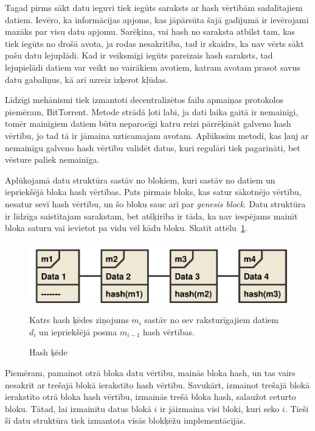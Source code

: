 Tagad pirms sākt datu ieguvi tiek iegūts saraksts ar hash vērtībām sadalītajiem datiem. Ievēro, ka informācijas apjoms, kas jāpārsūta šajā gadījumā ir ievērojami mazāks par visu datu apjomu. Sarēķina, vai hash no saraksta atbilst tam, kas tiek iegūts no drošā avota, ja rodas nesakritība, tad ir skaidrs, ka nav vērts sākt pašu datu lejuplādi. Kad ir veiksmīgi iegūts pareizais hash saraksts, tad lejupielādi datiem var veikt no vairākiem avotiem, katram avotam prasot savus datu gabaliņus, kā arī uzreiz izķerot kļūdas.

Līdzīgi mehānismi tiek izmantoti decentralizētos failu apmaiņas protokolos piemēram, BitTorrent. Metode strādā ļoti labi, ja dati laika gaitā ir nemainīgi, tomēr mainīgiem datiem būtu neparocīgi katru reizi pārrēķināt galveno hash vērtību, jo tad tā ir jāmaina uzticamajam avotam. Aplūkosim metodi, kas ļauj ar nemainīgu galveno hash vērtību validēt datus, kuri regulāri tiek pagarināti, bet vēsture paliek nemainīga.

Aplūkojamā datu struktūra sastāv no blokiem, kuri sastāv no datiem un iepriekšējā bloka hash vērtības.\cite{nakamoto08} Pats pirmais bloks, kas satur sākotnējo vērtību, nesatur sevī hash vērtību, un šo bloku sauc arī par \textit{genesis block}. 
Datu struktūra ir līdzīga saistītajam sarakstam, bet atšķirība ir tāda, ka nav iespējams mainīt bloka saturu vai ievietot pa vidu vēl kādu bloku. Skatīt attēlu~\ref{fig:hash-chain}.


\begin{figure}[htpb]
    \centering
    \includegraphics[scale=0.5]{teorija/hash-chain.pdf}
    \caption{Hash ķēde}
    Katrs hash ķēdes ziņojums $m_i$ sastāv no sev raksturīgajiem datiem $d_i$ un
    iepriekšējā posma $m_{i-1}$ hash vērtības.
\label{fig:hash-chain}
\end{figure}

Piemēram, pamainot otrā bloka datu vērtību, mainās bloka hash, un tas vairs nesakrīt ar trešajā blokā ierakstīto hash vērtību. Savukārt, izmainot trešajā blokā ierakstīto otrā bloka hash vērtību, izmainās trešā bloka hash, salaužot ceturto bloku. Tātad, lai izmainītu datus blokā $i$ ir jāizmaina visi bloki, kuri seko $i$. Tieši šī datu struktūra tiek izmantota visās blokķēžu implementācijās.

